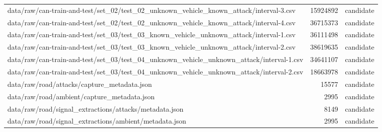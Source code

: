 \begin{tabular}{lrl}
data/raw/can-train-and-test/set\_02/test\_02\_unknown\_vehicle\_known\_attack/interval-3.csv & 15924892 & candidate \\
data/raw/can-train-and-test/set\_02/test\_02\_unknown\_vehicle\_known\_attack/interval-4.csv & 36715373 & candidate \\
data/raw/can-train-and-test/set\_03/test\_03\_known\_vehicle\_unknown\_attack/interval-1.csv & 36111498 & candidate \\
data/raw/can-train-and-test/set\_03/test\_03\_known\_vehicle\_unknown\_attack/interval-2.csv & 38619635 & candidate \\
data/raw/can-train-and-test/set\_03/test\_04\_unknown\_vehicle\_unknown\_attack/interval-1.csv & 34641107 & candidate \\
data/raw/can-train-and-test/set\_03/test\_04\_unknown\_vehicle\_unknown\_attack/interval-2.csv & 18663978 & candidate \\
data/raw/road/attacks/capture\_metadata.json & 15577 & candidate \\
data/raw/road/ambient/capture\_metadata.json & 2995 & candidate \\
data/raw/road/signal\_extractions/attacks/metadata.json & 8149 & candidate \\
data/raw/road/signal\_extractions/ambient/metadata.json & 2995 & candidate \\
\bottomrule
\end{tabular}

